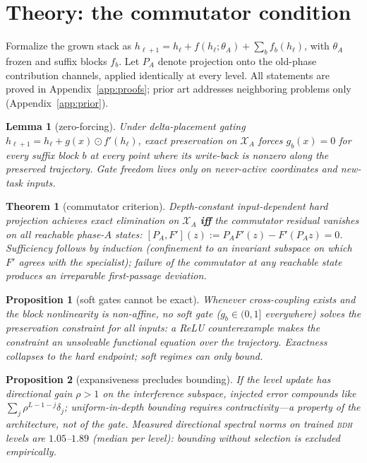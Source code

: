 \documentclass[11pt]{article}
\newtheorem{theorem}{Theorem}
\newtheorem{lemma}{Lemma}
\newtheorem{proposition}{Proposition}
\theoremstyle{remark}\newtheorem{remark}{Remark}
\newcommand{\BDH}{\textsc{bdh}}
\begin{document}
\section{Theory: the commutator condition}
\label{sec:theory}

Formalize the grown stack as $h_{\ell+1} = h_\ell + f(h_\ell;\theta_A) + \sum_{b} f_b(h_\ell)$,
with $\theta_A$ frozen and suffix blocks $f_b$. Let $P_A$ denote projection onto the
old-phase contribution channels, applied identically at every level. All statements are
proved in Appendix~\ref{app:proofs}; prior art addresses neighboring problems only
(Appendix~\ref{app:prior}).

\begin{lemma}[zero-forcing]\label{lem:zf}
Under delta-placement gating $h_{\ell+1}=h_\ell + g(x)\odot f'(h_\ell)$, exact preservation
on $\mathcal{X}_A$ forces $g_b(x)=0$ for every suffix block $b$ at every point where its
write-back is nonzero along the preserved trajectory. Gate freedom lives only on
never-active coordinates and new-task inputs.
\end{lemma}

\begin{theorem}[commutator criterion]\label{thm:comm}
Depth-constant input-dependent hard projection achieves exact elimination on
$\mathcal{X}_A$ \textbf{iff} the commutator residual vanishes on all reachable phase-$A$
states:
$[P_A,F'](z) := P_A F'(z) - F'(P_A z) = 0$. Sufficiency follows by induction
(confinement to an invariant subspace on which $F'$ agrees with the specialist); failure
of the commutator at any reachable state produces an irreparable first-passage deviation.
\end{theorem}

\begin{proposition}[soft gates cannot be exact]\label{prop:soft}
Whenever cross-coupling exists and the block nonlinearity is non-affine, no soft gate
($g_b \in (0,1]$ everywhere) solves the preservation constraint for all inputs: a ReLU
counterexample makes the constraint an unsolvable functional equation over the trajectory.
Exactness collapses to the hard endpoint; soft regimes can only bound.
\end{proposition}

\begin{proposition}[expansiveness precludes bounding]\label{prop:bound}
If the level update has directional gain $\rho>1$ on the interference subspace, injected
error compounds like $\sum_j \rho^{L-1-j}\delta_j$; uniform-in-depth bounding requires
contractivity---a property of the architecture, not of the gate. Measured directional
spectral norms on trained \BDH{} levels are $1.05$--$1.89$ (median per level): bounding
without selection is excluded empirically.
\end{proposition}
\end{document}
